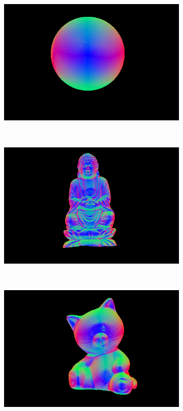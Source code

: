 \documentclass{paper}
\begin{document}
\begin{figure}[h!]
    \centering
    \begin{subfigure}{0.3\textwidth}
        \includegraphics[width=\textwidth]{results/gray/gray_n}
    \end{subfigure}
    ~
    \begin{subfigure}{0.3\textwidth}
        \includegraphics[width=\textwidth]{results/buddha/buddha_n}
    \end{subfigure}
    ~
    \begin{subfigure}{0.3\textwidth}
        \includegraphics[width=\textwidth]{results/cat/cat_n}
    \end{subfigure}
    

\end{figure}
\end{document}
